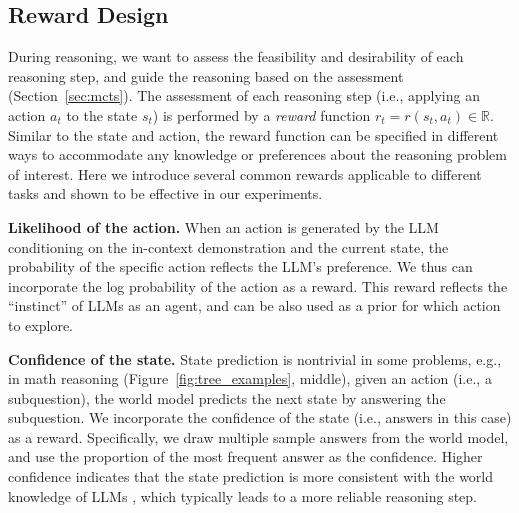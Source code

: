 


\subsection{Reward Design} \label{sec:reward}

During reasoning, we want to assess the feasibility and desirability of each reasoning step, and guide the reasoning based on the assessment (Section~\ref{sec:mcts}). 
The assessment of each reasoning step (i.e., applying an action $a_t$ to the state $s_{t}$) is performed by a \emph{reward} function $r_t = r(s_t, a_t) \in \mathbb R$. Similar to the state and action, the reward function can be specified in different ways to accommodate any knowledge or preferences about the reasoning problem of interest. Here we introduce several common rewards applicable to different tasks and shown to be effective in our experiments.

\noindent \textbf{Likelihood of the action.}
When an action is generated by the LLM conditioning on the in-context demonstration and the current state, the probability of the specific action reflects the LLM's preference. We thus can incorporate the log probability of the action as a reward. This reward reflects the ``instinct'' of LLMs as an agent, and can be also used as a prior for which action to explore.

\noindent \textbf{Confidence of the state.}
State prediction is nontrivial in some problems, e.g., in math reasoning (Figure~\ref{fig:tree_examples}, middle), given an action (i.e., a subquestion), the world model predicts the next state by answering the subquestion. We incorporate the confidence of the state (i.e., answers in this case) as a reward. Specifically, we draw multiple sample answers from the world model, and use the proportion of the most frequent answer as the confidence. Higher confidence indicates that the state prediction is more consistent with the world knowledge of LLMs \cite{hao2023bertnet}, which typically leads to a more reliable reasoning step.


